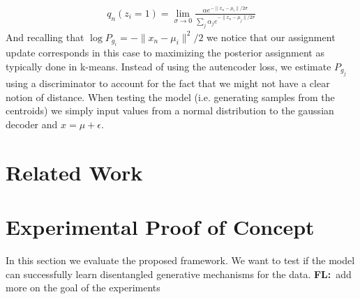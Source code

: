 \documentclass{article}
\newcommand{\FL}[1]{\textbf{\color{violet}FL:}{~\color{cyan}#1}}
\begin{document}
 \begin{align*}
 q_n(z_i = 1) = \lim_{\sigma\rightarrow 0} \frac{\alpha e^{-\|x_n-\mu_i\|/2\sigma}}{\sum_j\alpha_je^{-\|x_n-\mu_j\|/2\sigma}}
 \end{align*}
And recalling that $\log P_{g_i} = - \| x_n -\mu_i \|^2/2$ we notice that our assignment update corresponds in this case to maximizing the posterior assignment as typically done in k-means. Instead of using the autencoder loss, we estimate $P_{g_j}$ using a discriminator to account for the fact that we might not have a clear notion of distance. 
When testing the model (i.e. generating samples from the centroids) we simply input values from a normal distribution to the gaussian decoder and $x = \mu + \epsilon$.

\section{Related Work}

\section{Experimental Proof of Concept}
In this section we evaluate the proposed framework. We want to test if the model can successfully learn disentangled generative mechanisms for the data.
\FL{add more on the goal of the experiments}
\end{document}
